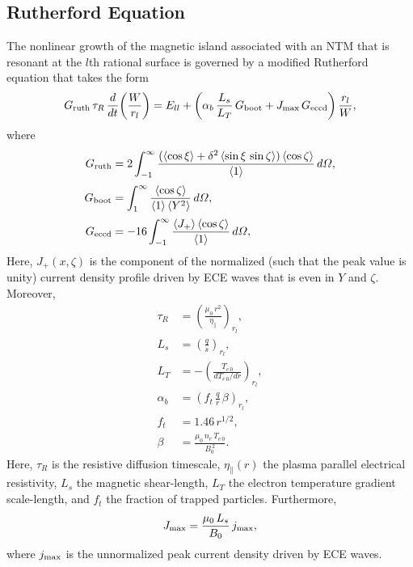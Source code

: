 \documentclass[12pt,prb,aps]{revtex4-1}
\begin{document}
\subsection{Rutherford Equation}
The nonlinear growth of the magnetic island associated with an NTM that is resonant at the $l$th rational surface is governed by a modified Rutherford equation that takes the form\,\cite{ntm1,ntm4,island}
\begin{equation}\label{eruth}
G_{\rm ruth}\,\tau_R\,\frac{d}{dt}\!\left(\frac{W}{r_l}\right) = E_{ll} +\left(\alpha_b\,\frac{L_s}{L_T}\,G_{\rm boot} + J_{\rm max}\,G_{\rm eccd}\right)
\frac{r_l}{W},
\end{equation}
where
\begin{align}
G_{\rm ruth} &= 2\int_{-1}^\infty \frac{(\langle\cos\xi\rangle + \delta^2\,\langle \sin\xi\,\sin\zeta\rangle)\,\langle \cos\zeta\rangle}{\langle 1\rangle}\,d{\mit\Omega},\\[0.5ex]
G_{\rm boot} &= \int_1^\infty \frac{\langle \cos\zeta\rangle}{\langle 1\rangle\,\langle Y^2\rangle}\,d{\mit\Omega},\\[0.5ex]
G_{\rm eccd} &= - 16\int_{-1}^\infty \frac{\langle J_+\rangle\,\langle \cos\zeta\rangle}{\langle 1\rangle}\,d{\mit\Omega},\label{geccd}
\end{align}
Here,  $J_+(x,\zeta)$ is the component of the normalized  (such that the peak value is unity) current density profile driven by ECE waves that is even in $Y$ and $\zeta$. 
Moreover, 
\begin{align}
\tau_R &= \left(\frac{\mu_0\,r^2}{\eta_\parallel}\right)_{r_l},\\[0.5ex]
L_s&=\left(\frac{q}{s}\right)_{r_l},\\[0.5ex]
L_T &= -\left(\frac{T_{e\,0}}{dT_{e\,0}/dr}\right)_{r_l},\\[0.5ex]
\alpha_b &= \left(f_t\,\frac{q}{r}\,\beta\right)_{r_l},\\[0.5ex]
f_t&= 1.46\,r^{1/2},\\[0.5ex]
\beta &= \frac{\mu_0\,n_e\,T_{e\,0}}{B_0^{\,2}}.
\end{align}
Here, $\tau_R$ is the resistive diffusion timescale, $\eta_\parallel(r)$  the plasma parallel electrical resistivity, $L_s$  the magnetic shear-length, 
$L_T$ the electron temperature gradient scale-length, and $f_t$  the fraction of trapped particles.
Furthermore,
\begin{equation}
J_{\rm max} = \frac{\mu_0\,L_s}{B_0}\,j_{\rm max},
\end{equation}
where $j_{\rm max}$ is the unnormalized peak current density driven by ECE waves.  
\end{document}
